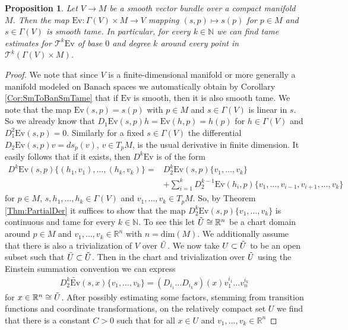 \documentclass[12pt,a4paper]{article}
\theoremstyle{plain}
\newtheorem{proposition}[theorem]{Proposition}
\theoremstyle{definition}
\newcommand{\R}{\mathbb{R}}
\newcommand{\N}{\mathbb{N}}
\newcommand{\Ev}{\mathrm{Ev}}
\begin{document}
\begin{proposition}
\label{Prop:EvVBSmooth}
Let $V\to M$ be a smooth vector bundle over a compact manifold $M$. Then the map $\mathrm{Ev}: \Gamma(V)\times M\to V$ mapping $(s,p)\mapsto s(p)$ for $p\in M$ and $s\in \Gamma(V)$ is smooth tame. In particular, for every $k\in \N$ we can find tame estimates for $\mathcal T^k\mathrm{Ev}$ of base $0$ and degree $k$ around every point in $\mathcal{T}^k(\Gamma(V)\times M)$.
\end{proposition}
\begin{proof}
We note that since $V$ is a finite-dimensional manifold or more generally a manifold modeled on Banach spaces we automatically obtain by Corollary \ref{Cor:SmToBanSmTame} that if $\Ev$ is smooth, then it is also smooth tame.
We note that the map $\mathrm{Ev}(s,p)=s(p)$ with 
$p\in M$ and $s\in \Gamma(V)$ is linear in $s$. So we already know that 
$D_1\Ev(s,p)h=\Ev(h,p)=h(p)$ for $h\in\Gamma(V)$ and $D_1^2\Ev(s,p)=0$. Similarly for a fixed $s\in \Gamma(V)$ the differential $D_2\Ev(s,p)v=ds_p(v)$, $v\in T_pM$, is the usual derivative in finite dimension. It easily follows that if it exists, then $D^k\Ev$ is of the form
\begin{align*}
    D^k\Ev(s,p)\{(h_1,v_1),\ldots,(h_k,v_k)\}=&D^k_2 \Ev(s,p)\{v_1,\ldots,v_k\}\\
    &+\sum_{i=1}^kD^{k-1}_2 \Ev(h_i,p)\{v_1,\ldots,v_{i-1},v_{i+1},\ldots,v_k\}
\end{align*}
for $p\in M$, $s,h_1,\ldots,h_k\in \Gamma(V)$ and $v_1,\ldots,v_k\in T_pM$.
So, by Theorem \ref{Thm:PartialDer} it suffices to show that the map $D_2^k\Ev(s,p)\{v_1,\ldots,v_k\}$ is continuous and tame for every $k\in \N$.
To see this let $\Tilde{U}\cong \R^n$ be a chart domain around $p\in M$ and $v_1,\ldots,v_k\in \R^n$ with $n=\mathrm{dim}(M)$. We additionally assume that there is also a trivialization of $V$ over $\Tilde{U}$. We now take $U\subset \Tilde{U}$ to be an open subset such that $\Bar{U}\subset \Tilde{U}$. Then in the chart and trivialization over $\Tilde{U}$ using the Einstein summation convention we can express 
\begin{align}
\label{eq:D_1^k(Ev)}
    D_2^k\widetilde{\Ev}(s,x)\{v_1,\ldots,v_k\}=(D_{i_1}\ldots D_{i_k} s)(x)v_1^{i_1}\ldots v_n^{i_k}
\end{align}
for $x\in \R^n\cong \Tilde{U}$.
After possibly estimating some factors, stemming from transition functions and coordinate transformations, on the relatively compact set $U$ we find
that there is a constant $C>0$ such that for all $x\in U$ and $v_1,\ldots,v_k \in \R^n$ 

\end{proof}
\end{document}
